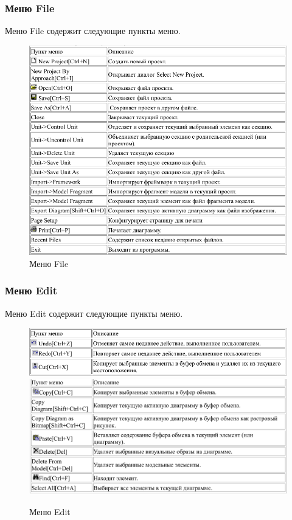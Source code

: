 \documentclass[a4paper,12pt]{report}
\begin{document}
\subsubsection*{Меню File}
Меню File содержит следующие пункты меню.
\begin{figure}[h!]
	\centering
	\includegraphics[width=\linewidth]{images/filemenu}
	\caption{Меню File}
	\label{fig:filemenu}
\end{figure}
\newpage
\subsubsection*{Меню Edit}
Меню Edit содержит следующие пункты меню.
\begin{figure}[h!]
	\centering
	\includegraphics[width=\linewidth]{images/editmenu1}
	\includegraphics[width=1.005\linewidth]{images/editmenu2}
	\caption{Меню Edit}
	\label{fig:editmenu}
\end{figure}
\newpage
\end{document}
